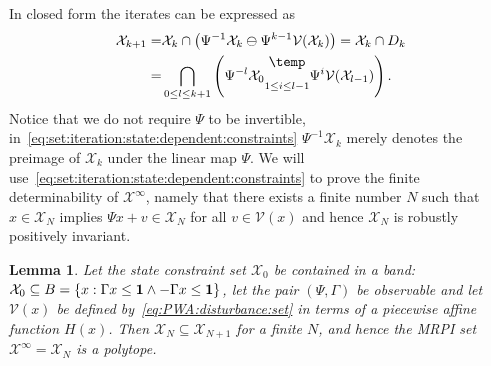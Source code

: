 \documentclass[letterpaper, 10pt, conference]{ieeeconf} %
\newtheorem{thm}{Lemma}[section]
\newcommand{\bigominus}{\raisebox{10pt}{$\temp$}}
\begin{document}
%
In closed form the iterates can be expressed as
%
\begin{equation}\label{eq:set:iteration:state:dependent:constraints}
\begin{split}
	\mathcal X_{k+1} =& \mathcal X_k\cap\left(\Psi^{-1}\mathcal X_k \ominus \Psi^{k-1}\mathcal V(\mathcal X_k)\right)
	=\mathcal X_k\cap D_k \\
	=& \bigcap_{0\leq l\leq k+1}\left( \Psi^{-l} \mathcal X_0 \underset{1 \leq i\leq l-1}{\bigominus} 
  \Psi^i \mathcal V(\mathcal X_{l-1})\right).
\end{split}\end{equation}
%
Notice that we do not require $\Psi$ to be invertible, in~\eqref{eq:set:iteration:state:dependent:constraints} $\Psi^{-1}\mathcal X_k$
merely denotes the preimage of $\mathcal X_k$ under the linear map $\Psi$.
We will use~\eqref{eq:set:iteration:state:dependent:constraints} to prove the finite determinability of
$\mathcal X^\infty$, namely that there exists a finite number $N$ such that $x\in\mathcal X_N$ implies
$\Psi x + v \in\mathcal X_N$ for all $v\in\mathcal V(x)$ and hence $\mathcal X_N$ is robustly positively invariant.
%
\begin{thm}\label{thm:finite:MRPI:set:state:dependable}
Let the state constraint set $\mathcal X_0$ be contained in a band: $\mathcal X_0\subseteq B=\{x:\Gamma x\leq{\bf{1}}\wedge 
-\Gamma x\leq{\bf{1}}\}$, let the pair $(\Psi,\Gamma)$ be observable and let $\mathcal V(x)$ be defined 
by~\eqref{eq:PWA:disturbance:set} in terms of a piecewise affine function $H(x)$. Then $\mathcal X_N\subseteq \mathcal 
X_{N+1}$ for a finite $N$, and hence the MRPI set $\mathcal X^\infty =\mathcal X_N$ is a polytope.
\end{thm}
%
\end{document}
